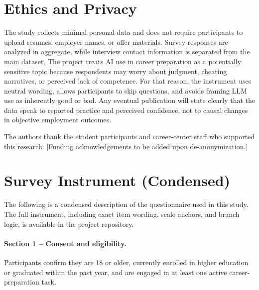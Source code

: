 \documentclass[sigconf,review,anonymous]{acmart}
\begin{document}
\section{Ethics and Privacy}

The study collects minimal personal data and does not require participants to upload resumes, employer names, or offer materials. Survey responses are analyzed in aggregate, while interview contact information is separated from the main dataset. The project treats AI use in career preparation as a potentially sensitive topic because respondents may worry about judgment, cheating narratives, or perceived lack of competence. For that reason, the instrument uses neutral wording, allows participants to skip questions, and avoids framing LLM use as inherently good or bad. Any eventual publication will state clearly that the data speak to reported practice and perceived confidence, not to causal changes in objective employment outcomes.

\begin{acks}
The authors thank the student participants and career-center staff who supported this research. [Funding acknowledgements to be added upon de-anonymization.]
\end{acks}




\appendix

\section{Survey Instrument (Condensed)}
\label{app:instrument}

The following is a condensed description of the questionnaire used in this study. The full instrument, including exact item wording, scale anchors, and branch logic, is available in the project repository.

\paragraph{Section 1 -- Consent and eligibility.}
Participants confirm they are 18 or older, currently enrolled in higher education or graduated within the past year, and are engaged in at least one active career-preparation task.
\end{document}

